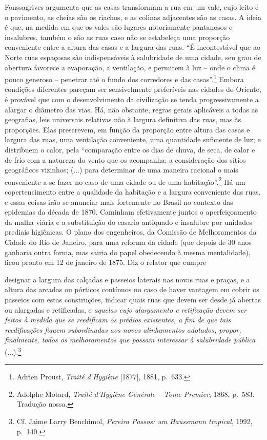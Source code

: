 Fonssagrives argumenta que as casas transformam a rua em um vale, cujo
leito é o pavimento, as cheias são os riachos, e as colinas adjacentes
são as casas. A ideia é que, na medida em que os vales são lugares
notoriamente pantanosos e insalubres, também o são as ruas caso não se
estabeleça uma proporção conveniente entre a altura das casas e a
largura das ruas. ``É incontestável que ao Norte ruas espaçosas são
indispensáveis à salubridade de uma cidade, seu grau de abertura
favorece a evaporação, a ventilação, e permitem à luz -- onde o clima é
pouco generoso -- penetrar até o fundo dos corredores e das
casas''.\footnote{Adrien Proust, \emph{Traité d'Hygiène} {[}1877{]},
  1881, p.~633.} Embora condições diferentes pareçam ser sensivelmente
preferíveis nas cidades do Oriente, é provável que com o desenvolvimento
da civilização se tenda progressivamente a alargar o diâmetro das vias.
Há, não obstante, regras gerais aplicáveis a todas as geografias, leis
universais relativas não à largura definitiva das ruas, mas às
proporções. Elas prescrevem, em função da proporção entre altura das
casas e largura das ruas, uma ventilação conveniente, uma quantidade
suficiente de luz; e distribuem o calor, pela ``comparação entre os dias
de chuva, de seca, de calor e de frio com a natureza do vento que os
acompanha; a consideração dos sítios geográficos vizinhos; (...) para
determinar de uma maneira racional o mais conveniente a se fazer no caso
de uma cidade ou de uma habitação''.\footnote{Adolphe Motard,
  \emph{Traité d'Hygiène Générale} \emph{-- Tome Premier}, 1868, p.~583.
  Tradução nossa.} Há um copertencimento entre a qualidade da habitação
e a largura conveniente das ruas, e essas coisas irão se anunciar mais
fortemente no Brasil no contexto das epidemias da década de 1870.
Caminham efetivamente juntos o aperfeiçoamento da malha viária e a
substituição do casario antiquado e insalubre por unidades prediais
higiênicas. O plano dos engenheiros, da Comissão de Melhoramentos da
Cidade do Rio de Janeiro, para uma reforma da cidade (que depois de 30
anos ganharia outra forma, mas sairia do papel obedecendo à mesma
mentalidade), ficou pronto em 12 de janeiro de 1875. Diz o relator que
cumpre

designar a largura das calçadas e passeios laterais nas novas ruas e
praças, e a altura das arcadas ou pórticos contínuos no caso de haver
vantagem em cobrir os passeios com estas construções, indicar quais ruas
que devem ser desde já abertas ou alargadas e retificadas, e
\emph{aquelas cujo alargamento e retificação devem ser feitos à medida
que se reedificam os prédios existentes, a fim de que tais reedificações
fiquem subordinadas aos novos alinhamentos adotados; propor, finalmente,
todos os melhoramentos que possam interessar à salubridade pública}
(...).\footnote{Cf. Jaime Larry Benchimol, \emph{Pereira Passos: um
  Haussmann tropical}, 1992, p.~140.}

